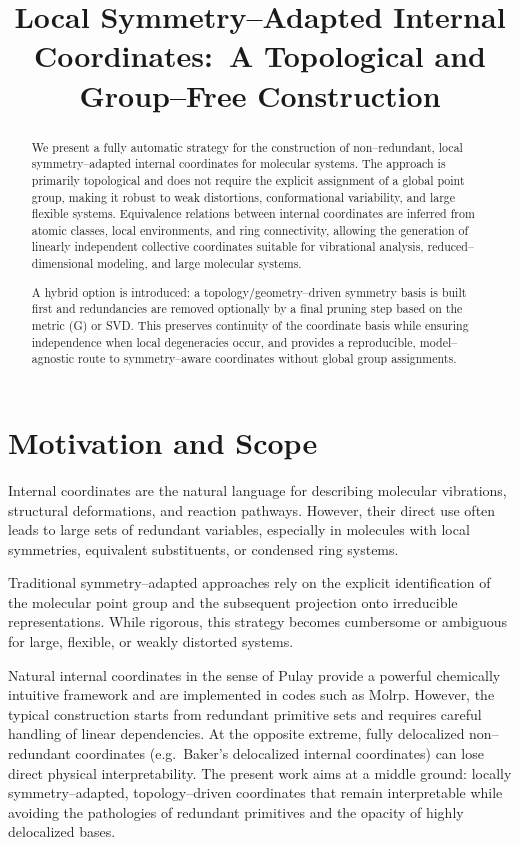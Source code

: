 \documentclass[11pt,a4paper]{article}
\title{Local Symmetry--Adapted Internal Coordinates:\
A Topological and Group--Free Construction}
\author{}
\date{}
\begin{document}
\maketitle

\begin{abstract}
We present a fully automatic strategy for the construction of non--redundant,
local symmetry--adapted internal coordinates for molecular systems.
The approach is primarily topological and does not require the explicit
assignment of a global point group, making it robust to weak distortions,
conformational variability, and large flexible systems.
Equivalence relations between internal coordinates are inferred from atomic
classes, local environments, and ring connectivity, allowing the generation of
linearly independent collective coordinates suitable for vibrational analysis,
reduced--dimensional modeling, and large molecular systems.

A hybrid option is introduced: a topology/geometry--driven symmetry basis is
built first and redundancies are removed optionally by a final pruning step
based on the metric (G) or SVD. This preserves continuity of the coordinate
basis while ensuring independence when local degeneracies occur, and provides
a reproducible, model--agnostic route to symmetry--aware coordinates without
global group assignments.
\end{abstract}

\section{Motivation and Scope}

Internal coordinates are the natural language for describing molecular
vibrations, structural deformations, and reaction pathways.
However, their direct use often leads to large sets of redundant variables,
especially in molecules with local symmetries, equivalent substituents,
or condensed ring systems.

Traditional symmetry--adapted approaches rely on the explicit identification
of the molecular point group and the subsequent projection onto irreducible
representations.
While rigorous, this strategy becomes cumbersome or ambiguous for large,
flexible, or weakly distorted systems.

Natural internal coordinates in the sense of Pulay provide a powerful
chemically intuitive framework and are implemented in codes such as Molrp.\cite{pulay_natural,molrp}
However, the typical construction starts from redundant primitive sets and
requires careful handling of linear dependencies. At the opposite extreme,
fully delocalized non--redundant coordinates (e.g.\ Baker's delocalized
internal coordinates) can lose direct physical interpretability.\cite{baker_deloc}
The present work aims at a middle ground: locally symmetry--adapted,
topology--driven coordinates that remain interpretable while avoiding the
pathologies of redundant primitives and the opacity of highly delocalized bases.
\end{document}
